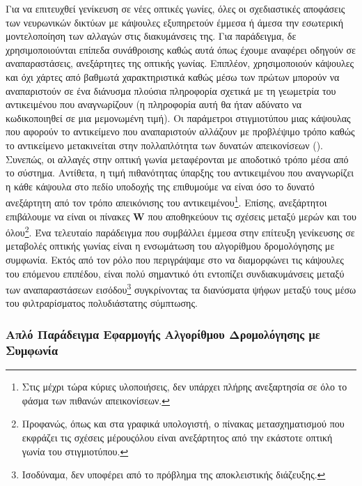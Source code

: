 Για να επιτευχθεί γενίκευση σε νέες οπτικές γωνίες, όλες οι σχεδιαστικές αποφάσεις των νευρωνικών δικτύων με κάψουλες εξυπηρετούν έμμεσα ή άμεσα την εσωτερική μοντελοποίηση των αλλαγών στις διακυμάνσεις της. Για παράδειγμα, δε χρησιμοποιούνται επίπεδα συνάθροισης καθώς αυτά όπως έχουμε αναφέρει οδηγούν σε αναπαραστάσεις, ανεξάρτητες της οπτικής γωνίας. Επιπλέον, χρησιμοποιούν κάψουλες και όχι χάρτες από βαθμωτά χαρακτηριστικά καθώς μέσω των πρώτων μπορούν να αναπαριστούν σε ένα διάνυσμα πλούσια πληροφορία σχετικά με τη γεωμετρία του αντικειμένου που αναγνωρίζουν (η πληροφορία αυτή θα ήταν αδύνατο να κωδικοποιηθεί σε μια μεμονωμένη τιμή). Οι παράμετροι στιγμιοτύπου μιας κάψουλας που αφορούν το αντικείμενο που αναπαριστούν αλλάζουν με προβλέψιμο τρόπο καθώς το αντικείμενο μετακινείται στην πολλαπλότητα των δυνατών απεικονίσεων (). Συνεπώς, οι αλλαγές στην οπτική γωνία μεταφέρονται με αποδοτικό τρόπο μέσα από το σύστημα. Αντίθετα, η τιμή πιθανότητας ύπαρξης του αντικειμένου που αναγνωρίζει η κάθε κάψουλα στο πεδίο υποδοχής της επιθυμούμε να είναι όσο το δυνατό ανεξάρτητη από τον τρόπο απεικόνισης του αντικειμένου\footnote{Στις μέχρι τώρα κύριες υλοποιήσεις, δεν υπάρχει πλήρης ανεξαρτησία σε όλο το φάσμα των πιθανών απεικονίσεων.}. Επίσης, ανεξάρτητοι επιβάλουμε να είναι οι πίνακες $\boldsymbol{W}$ που αποθηκεύουν τις σχέσεις μεταξύ μερών και του όλου\footnote{Προφανώς, όπως και στα γραφικά υπολογιστή, ο πίνακας μετασχηματισμού που εκφράζει τις σχέσεις μέρους\textendash όλου είναι ανεξάρτητος από την εκάστοτε οπτική γωνία του στιγμιοτύπου.}. Ένα τελευταίο παράδειγμα που συμβάλλει έμμεσα στην επίτευξη γενίκευσης σε μεταβολές οπτικής γωνίας είναι η ενσωμάτωση του αλγορίθμου δρομολόγησης με συμφωνία. Εκτός από τον ρόλο που περιγράψαμε στο να διαμορφώνει τις κάψουλες του επόμενου επιπέδου, είναι πολύ σημαντικό ότι εντοπίζει συνδιακυμάνσεις μεταξύ των αναπαραστάσεων εισόδου\footnote{Ισοδύναμα, δεν υποφέρει από το πρόβλημα της αποκλειστικής διάζευξης.} συγκρίνοντας τα διανύσματα ψήφων μεταξύ τους μέσω του φιλτραρίσματος πολυδιάστατης σύμπτωσης.

\subsubsection{Απλό Παράδειγμα Εφαρμογής Αλγορίθμου Δρομολόγησης με Συμφωνία}

